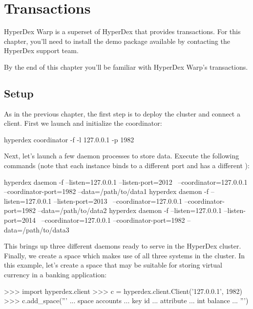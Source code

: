 \chapter{Transactions}
\label{chap:transactions}

HyperDex Warp is a superset of HyperDex that provides transactions.  For this
chapter, you'll need to install the  demo package available
by contacting the HyperDex support team.

By the end of this chapter you'll be familiar with HyperDex Warp's transactions.

\section{Setup}
\label{sec:transactions:setup}

As in the previous chapter, the first step is to deploy the cluster and connect
a client.   First we launch and initialize the coordinator:

\begin{consolecode}
hyperdex coordinator -f -l 127.0.0.1 -p 1982
\end{consolecode}

Next, let's launch a few daemon processes to store data.  Execute the following
commands (note that each instance binds to a different port and has a different
):

\begin{consolecode}
hyperdex daemon -f --listen=127.0.0.1 --listen-port=2012 \
                   --coordinator=127.0.0.1 --coordinator-port=1982 --data=/path/to/data1
hyperdex daemon -f --listen=127.0.0.1 --listen-port=2013 \
                   --coordinator=127.0.0.1 --coordinator-port=1982 --data=/path/to/data2
hyperdex daemon -f --listen=127.0.0.1 --listen-port=2014 \
                   --coordinator=127.0.0.1 --coordinator-port=1982 --data=/path/to/data3
\end{consolecode}

This brings up three different daemons ready to serve in the HyperDex cluster.
Finally, we create a space which makes use of all three systems in the cluster.
In this example, let's create a space that may be suitable for storing virtual
currency in a banking application:

\begin{pyconcode}
>>> import hyperdex.client
>>> c = hyperdex.client.Client('127.0.0.1', 1982)
>>> c.add_space('''
... space accounts
... key id
... attribute
...    int balance
... ''')
\end{pyconcode}

